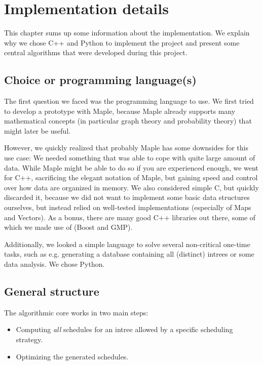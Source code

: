 \chapter{Implementation details}
\label{sec:additional-algs}

This chapter sums up some information about the implementation. We explain why we chose C++ and Python to implement the project and present some central algorithms that were developed during this project.

\section{Choice or programming language(s)}
\label{sec:implementation-prog-lang}

The first question we faced was the programming language to use. We first tried to develop a prototype with Maple, because Maple already supports many mathematical concepts (in particular graph theory and probability theory) that might later be useful.

However, we quickly realized that probably Maple has some downsides for this use case: We needed something that was able to cope with quite large amount of data. While Maple might be able to do so if you are experienced enough, we went for C++, sacrificing the elegant notation of Maple, but gaining speed and control over how data are organized in memory. We also considered simple C, but quickly discarded it, because we did not want to implement some basic data structures ourselves, but instead relied on well-tested implementations (especially of Maps and Vectors). As a bonus, there are many good C++ libraries out there, some of which we made use of (Boost and GMP).

Additionally, we looked a simple language to solve several non-critical one-time tasks, such as e.g. generating a database containing all (distinct) intrees or some data analysis. We chose Python.

\section{General structure}
\label{sec:implementation-general-structure}

The algorithmic core works in two main steps: 
\begin{itemize}
\item Computing \emph{all} schedules for an intree allowed by a specific scheduling strategy.
\item Optimizing the generated schedules.
\end{itemize}

